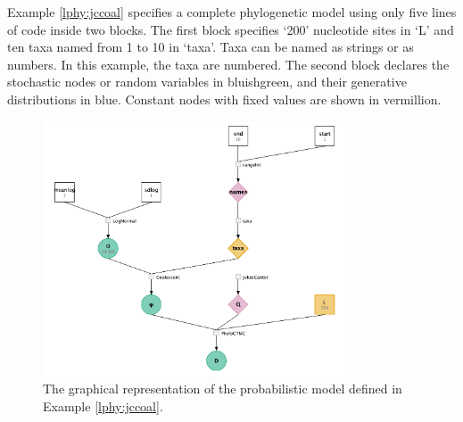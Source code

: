 \documentclass[10pt,letterpaper,table]{article}
\theoremstyle{definition}
\begin{document}
\medskip{}

Example \ref{lphy:jccoal} specifies a complete phylogenetic model using only five lines of code inside two blocks. 
The first block specifies `200' nucleotide sites in `L' and ten taxa named from 1 to 10 in `taxa'. 
Taxa can be named as strings or as numbers. 
In this example, the taxa are numbered. 
The second block declares the stochastic nodes or random variables in bluishgreen, and their generative distributions in blue. 
Constant nodes with fixed values are shown in vermillion.  


\begin{figure}
   \includegraphics[width=0.8\textwidth]{figs_plos/jc.png}
  \caption{The graphical representation of the probabilistic model defined in Example \ref{lphy:jccoal}.} 
  \label{fig:jccoalPGM}
\end{figure}



\end{document}
